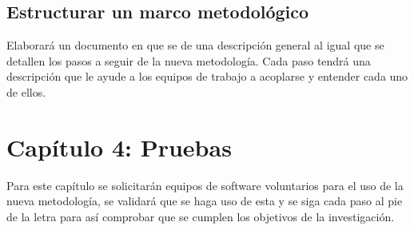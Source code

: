 	\subsection{Estructurar un marco metodológico}
		Elaborará un documento en que se de una descripción general al igual que se detallen los pasos a seguir de la nueva metodología. Cada paso tendrá una descripción que le ayude a los equipos de trabajo a acoplarse y entender cada uno de ellos.
		
\section{\textbf{Capítulo 4:} Pruebas}
	Para este capítulo se solicitarán equipos de software voluntarios para el uso de la nueva metodología, se validará que se haga uso de esta y se siga cada paso al pie de la letra para así comprobar que se cumplen los objetivos de la investigación.
	
